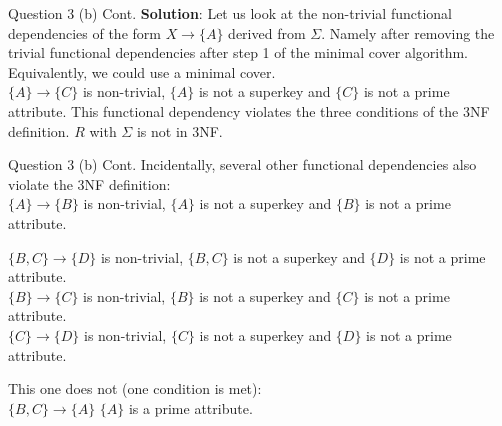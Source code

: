 \begin{frame}[fragile]{Question 3 (b) Cont.}
\textbf{Solution}:
Let us look at the non-trivial functional dependencies of the form $X \rightarrow \{A\}$ derived from $\Sigma$. Namely after removing the trivial functional dependencies after step 1 of the minimal cover algorithm. Equivalently, we could use a minimal cover.\\\vspace{3pt}
$\{A\} \rightarrow \{C\}$ is non-trivial, $\{A\}$ is not a superkey and $\{C\}$ is not a prime attribute. This functional dependency violates the three conditions of the 3NF definition. $R$ with $\Sigma$ is not in 3NF.\\\vspace{3pt}

\end{frame}

\begin{frame}[fragile]{Question 3 (b) Cont.}
Incidentally, several other functional dependencies also violate the 3NF definition:\\
$\{A\} \rightarrow \{B\}$ is non-trivial, $\{A\}$ is not a superkey and $\{B\}$ is not a prime attribute.\\\vspace{3pt}

$\{B, C\} \rightarrow \{D\}$ is non-trivial, $\{B, C\}$ is not a superkey and $\{D\}$ is not a prime attribute.\\
$\{B\} \rightarrow \{C\}$ is non-trivial, $\{B\}$ is not a superkey and $\{C\}$ is not a prime attribute.\\
$\{C\} \rightarrow \{D\}$ is non-trivial, $\{C\}$ is not a superkey and $\{D\}$ is not a prime attribute.\\\vspace{3pt}

This one does not (one condition is met):\\
$\{B, C\} \rightarrow \{A\}$ $\{A\}$ is a prime attribute.

\end{frame}

